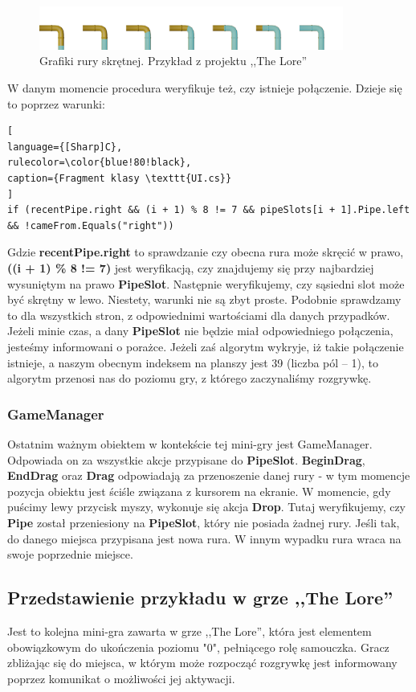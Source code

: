 \documentclass[oneside,polski,logo]{amuthesis}
\begin{document}
\begin{figure}[h]
	\centering
	\includegraphics[width=10cm]{images/tyrek/rury-5.png}
	\caption{Grafiki rury skrętnej. Przykład z projektu ,,The Lore''}
\end{figure}
W danym momencie procedura weryfikuje też, czy istnieje połączenie. Dzieje się to poprzez warunki:
\begin{lstlisting}[
language={[Sharp]C},
rulecolor=\color{blue!80!black},
caption={Fragment klasy \texttt{UI.cs}}
]
if (recentPipe.right && (i + 1) % 8 != 7 && pipeSlots[i + 1].Pipe.left 
&& !cameFrom.Equals("right"))
\end{lstlisting}
Gdzie \textbf{recentPipe.right} to sprawdzanie czy obecna rura może skręcić w prawo, \textbf{((i + 1) \% 8 != 7)} jest weryfikacją, czy znajdujemy się przy najbardziej wysuniętym na prawo \textbf{PipeSlot}. Następnie weryfikujemy, czy sąsiedni slot może być skrętny w lewo. Niestety, warunki nie są zbyt proste. Podobnie sprawdzamy to dla wszystkich stron, z odpowiednimi wartościami dla danych przypadków. Jeżeli minie czas, a dany \textbf{PipeSlot} nie będzie miał odpowiedniego połączenia, jesteśmy informowani o porażce. Jeżeli zaś algorytm wykryje, iż takie połączenie istnieje, a naszym obecnym indeksem na planszy jest 39 (liczba pól – 1), to algorytm przenosi nas do poziomu gry, z którego zaczynaliśmy rozgrywkę.

\subsubsection{GameManager}
\par Ostatnim ważnym obiektem w kontekście tej mini-gry jest GameManager. Odpowiada on za wszystkie akcje przypisane do \textbf{PipeSlot}. \textbf{BeginDrag}, \textbf{EndDrag} oraz \textbf{Drag} odpowiadają za przenoszenie danej rury - w tym momencje pozycja obiektu jest ściśle związana z kursorem na ekranie. W momencie, gdy puścimy lewy przycisk myszy, wykonuje się akcja \textbf{Drop}. Tutaj weryfikujemy, czy \textbf{Pipe} został przeniesiony na \textbf{PipeSlot}, który nie posiada żadnej rury. Jeśli tak, do danego miejsca przypisana jest nowa rura. W innym wypadku rura wraca na swoje poprzednie miejsce. 
\subsection{Przedstawienie przykładu w grze ,,The Lore''}
\par Jest to kolejna mini-gra zawarta w grze ,,The Lore'', która jest elementem obowiązkowym do ukończenia poziomu "0", pełniącego rolę samouczka. Gracz zbliżając się do miejsca, w którym może rozpocząć rozgrywkę jest informowany poprzez komunikat o możliwości jej aktywacji.
\end{document}
